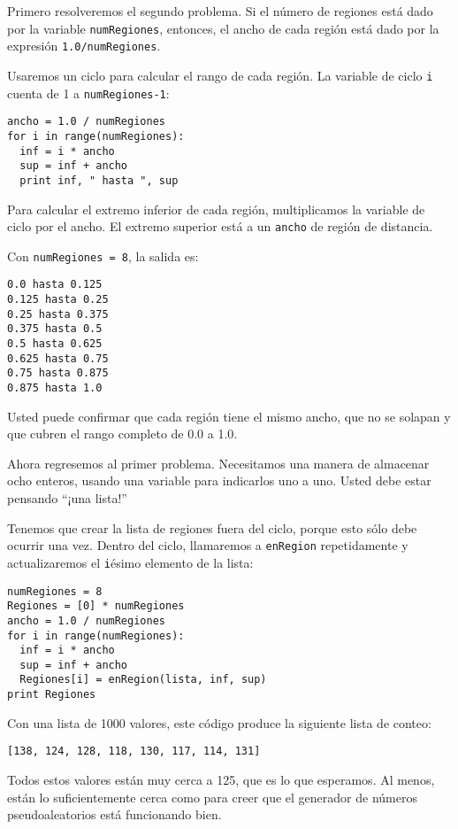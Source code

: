 Primero resolveremos el segundo problema. Si el número de
regiones está dado por la variable \texttt{numRegiones}, entonces, 
el ancho de cada región está dado por la expresión \texttt{1.0/numRegiones}.

Usaremos un ciclo para calcular el rango de cada región.
La variable de ciclo \texttt{i} cuenta de 1 a \texttt{numRegiones-1}:

\beforeverb
\begin{verbatim}
ancho = 1.0 / numRegiones
for i in range(numRegiones):
  inf = i * ancho
  sup = inf + ancho
  print inf, " hasta ", sup
\end{verbatim}
\afterverb
%
Para calcular el extremo inferior de cada región, multiplicamos
la variable de ciclo por el ancho. El extremo superior está
 a un  \texttt{ancho} de región de distancia.

Con \texttt{numRegiones = 8}, la salida es:

\beforeverb
\begin{verbatim}
0.0 hasta 0.125
0.125 hasta 0.25
0.25 hasta 0.375
0.375 hasta 0.5
0.5 hasta 0.625
0.625 hasta 0.75
0.75 hasta 0.875
0.875 hasta 1.0
\end{verbatim}
\afterverb
%
Usted puede confirmar que cada región tiene el mismo ancho,
que no se solapan y que cubren el rango completo de  0.0 a 1.0.

Ahora regresemos al primer problema. Necesitamos una manera
de almacenar ocho enteros, usando una variable para indicarlos
uno a uno.  Usted debe estar pensando ``¡una lista!''

Tenemos que crear la lista de regiones fuera del ciclo, porque 
esto sólo debe ocurrir una vez. Dentro del ciclo, llamaremos
a \texttt{enRegion} repetidamente y actualizaremos el  \texttt{i}ésimo 
elemento de la lista:

\beforeverb
\begin{verbatim}
numRegiones = 8
Regiones = [0] * numRegiones
ancho = 1.0 / numRegiones
for i in range(numRegiones):
  inf = i * ancho
  sup = inf + ancho
  Regiones[i] = enRegion(lista, inf, sup)
print Regiones
\end{verbatim}
\afterverb
%
Con una lista de 1000 valores, este código produce la siguiente lista
de conteo:

\beforeverb
\begin{verbatim}
[138, 124, 128, 118, 130, 117, 114, 131]
\end{verbatim}
\afterverb
%
Todos estos valores están muy cerca a 125, que es lo que esperamos.
Al menos, están lo suficientemente cerca como para creer que el
generador de números pseudoaleatorios está funcionando bien.

